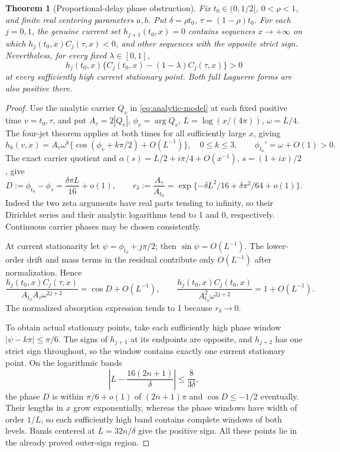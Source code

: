 \documentclass[11pt]{article}
\numberwithin{equation}{section}
\newtheorem{theorem}{Theorem}[section]
\theoremstyle{definition}
\theoremstyle{remark}
\begin{document}
\begin{theorem}[Proportional-delay phase obstruction]
\label{thm:proportional-delay-obstruction}
Fix $t_0\in(0,1/2]$, $0<\rho<1$, and finite real centering
parameters $a,b$.  Put $\delta=\rho t_0$, $\tau=(1-\rho)t_0$.
For each $j=0,1$, the genuine current set $h_{j+1}(t_0,x)=0$
contains sequences $x\to+\infty$ on which
$h_j(t_0,x)C_j(\tau,x)<0$, and other sequences with the opposite
strict sign.  Nevertheless, for every fixed $\lambda\in[0,1]$,
\[
 h_j(t_0,x)\{C_j(t_0,x)-(1-\lambda)C_j(\tau,x)\}>0
\]
at every sufficiently high current stationary point.  Both full
Laguerre forms are also positive there.
\end{theorem}
\begin{proof}
Use the analytic carrier $Q_v$ in \eqref{eq:analytic-model} at each
fixed positive time $v=t_0,\tau$, and put
$A_v=2|Q_v|$, $\phi_v=\arg Q_v$, $L=\log(x/(4\pi))$,
$\omega=L/4$.  The four-jet theorem applies at both times for all
sufficiently large $x$, giving
\[
 h_k(v,x)=A_v\omega^k\{\cos(\phi_v+k\pi/2)+O(L^{-1})\},
 \quad 0\le k\le3,\qquad \phi_{t_0}'=\omega+O(1)>0.
\]
The exact carrier quotient and
$\alpha(s)=L/2+i\pi/4+O(x^{-1})$, $s=(1+ix)/2$, give
\begin{equation}
 D:=\phi_{t_0}-\phi_\tau=\frac{\delta\pi L}{16}+o(1),\qquad
 r_\delta:=\frac{A_\tau}{A_{t_0}}
  =\exp\{-\delta L^2/16+\delta\pi^2/64+o(1)\}.
 \label{eq:fixed-delay-phase-amplitude}
\end{equation}
Indeed the two zeta arguments have real parts tending to infinity, so
their Dirichlet series and their analytic logarithms tend to 1 and 0,
respectively.  Continuous carrier phases may be chosen consistently.

At current stationarity let $\psi=\phi_{t_0}+j\pi/2$; then
$\sin\psi=O(L^{-1})$.  The lower-order drift and mass terms in the
residual contribute only $O(L^{-1})$ after normalization.  Hence
\[
 \frac{h_j(t_0,x)C_j(\tau,x)}
      {A_{t_0}A_\tau\omega^{2j+2}}=\cos D+O(L^{-1}),\qquad
 \frac{h_j(t_0,x)C_j(t_0,x)}
      {A_{t_0}^2\omega^{2j+2}}=1+O(L^{-1}).
\]
The normalized absorption expression tends to 1 because
$r_\delta\to0$.

To obtain actual stationary points, take each sufficiently high phase
window $|\psi-k\pi|\le\pi/6$.  The signs of $h_{j+1}$ at its
endpoints are opposite, and $h_{j+2}$ has one strict sign throughout,
so the window contains exactly one current stationary point.  On the
logarithmic bands
\[
 \left|L-\frac{16(2n+1)}\delta\right|\le\frac8{3\delta},
\]
the phase $D$ is within $\pi/6+o(1)$ of $(2n+1)\pi$ and
$\cos D\le-1/2$ eventually.  Their lengths in $x$ grow exponentially,
whereas the phase windows have width of order $1/L$, so each sufficiently
high band contains complete windows of both levels.  Bands centered at
$L=32n/\delta$ give the positive sign.  All these points lie in the
already proved outer-sign region.
\end{proof}
\end{document}
